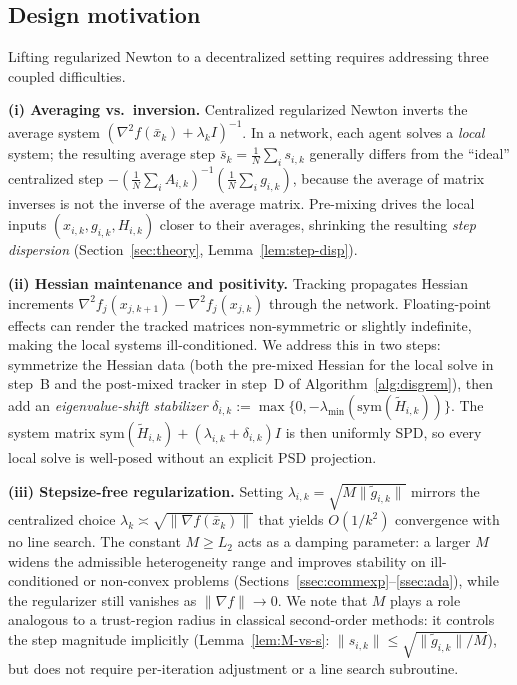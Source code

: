 \documentclass[10pt,twocolumn,letterpaper]{article}
\def\cO{O}%
\theoremstyle{compact}
\theoremstyle{compactremark}
\newcommand{\cO}{\mathcal{O}}
\begin{document}
	\subsection{Design motivation}\label{ssec:design}
	
	Lifting regularized Newton to a decentralized setting requires
	addressing three coupled difficulties.
	
	\textbf{(i) Averaging vs.\ inversion.}
	Centralized regularized Newton inverts the average system
	$(\nabla^2 f(\bar x_k)+\lambda_k I)^{-1}$.
	In a network, each agent solves a \emph{local} system; the
	resulting average step
	$\bar s_k=\frac1N\sum_i s_{i,k}$ generally differs from the
	``ideal'' centralized step
	$-(\frac1N\sum_i A_{i,k})^{-1}(\frac1N\sum_i g_{i,k})$,
	because the average of matrix inverses is not the inverse of
	the average matrix.
	Pre-mixing drives the local inputs
	$(x_{i,k},g_{i,k},H_{i,k})$ closer to their averages,
	shrinking the resulting \emph{step dispersion}
	(Section~\ref{sec:theory}, Lemma~\ref{lem:step-disp}).
	
	\textbf{(ii) Hessian maintenance and positivity.}
	Tracking propagates Hessian increments
	$\nabla^2 f_j(x_{j,k+1})-\nabla^2 f_j(x_{j,k})$ through the
	network.
	Floating-point effects can render the tracked matrices
	non-symmetric or slightly indefinite, making the local systems
	ill-conditioned.
	We address this in two steps: symmetrize the Hessian data
	(both the pre-mixed Hessian for the local solve in step~B
	and the post-mixed tracker in step~D of Algorithm~\ref{alg:disgrem}),
	then add an \emph{eigenvalue-shift stabilizer}
	$\delta_{i,k}:=\max\{0,-\lambda_{\min}(\mathrm{sym}(\tilde H_{i,k}))\}$.
	The system matrix
	$\mathrm{sym}(\tilde H_{i,k})+(\lambda_{i,k}+\delta_{i,k})I$
	is then uniformly SPD, so every local solve is well-posed
	without an explicit PSD projection.
	
	\textbf{(iii) Stepsize-free regularization.}
	Setting $\lambda_{i,k}=\sqrt{M\|\tilde g_{i,k}\|}$ mirrors
	the centralized choice
	$\lambda_k\asymp\sqrt{\|\nabla f(\bar x_k)\|}$ that yields
	$\cO(1/k^2)$ convergence with no line search.
	The constant $M\ge L_2$ acts as a damping parameter: a larger $M$
	widens the admissible heterogeneity range and improves
	stability on ill-conditioned or non-convex problems
	(Sections~\ref{ssec:commexp}--\ref{ssec:ada}), while the
	regularizer still vanishes as $\|\nabla f\|\to 0$.
	We note that $M$ plays a role analogous to a trust-region radius
	in classical second-order methods: it controls the step magnitude
	implicitly (Lemma~\ref{lem:M-vs-s}: $\|s_{i,k}\|\le\sqrt{\|\tilde g_{i,k}\|/M}$),
	but does not require per-iteration adjustment or a line search subroutine.
	
\end{document}
